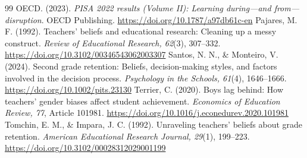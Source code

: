 \begin{thebibliography}{99}
 \color{reused} OECD. (2023). \textit{PISA 2022 results (Volume II): Learning during---and from---disruption}. OECD Publishing. \url{https://doi.org/10.1787/a97db61c-en}
 \color{reused} Pajares, M. F. (1992). Teachers' beliefs and educational research: Cleaning up a messy construct. \textit{Review of Educational Research, 62}(3), 307--332. \url{https://doi.org/10.3102/00346543062003307}
 \color{reused} Santos, N. N., \& Monteiro, V. (2024). Second grade retention: Beliefs, decision-making styles, and factors involved in the decision process. \textit{Psychology in the Schools, 61}(4), 1646--1666. \url{https://doi.org/10.1002/pits.23130}
 Terrier, C. (2020). Boys lag behind: How teachers' gender biases affect student achievement. \textit{Economics of Education Review, 77}, Article 101981. \url{https://doi.org/10.1016/j.econedurev.2020.101981}
 \color{reused} Tomchin, E. M., \& Impara, J. C. (1992). Unraveling teachers' beliefs about grade retention. \textit{American Educational Research Journal, 29}(1), 199--223. \url{https://doi.org/10.3102/00028312029001199}
\end{thebibliography}
